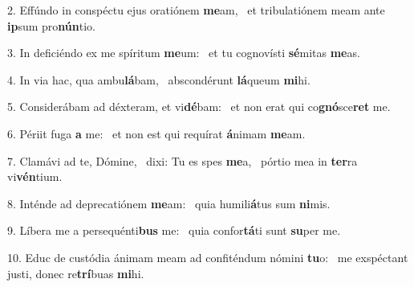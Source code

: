 2. Effúndo in conspéctu ejus oratiónem \textbf{me}am, \ast\  et tribulatiónem meam ante \textbf{ip}sum pro\textbf{nún}tio.\

3. In deficiéndo ex me spíritum \textbf{me}um: \ast\  et tu cognovísti \textbf{sé}mitas \textbf{me}as.\

4. In via hac, qua ambu\textbf{lá}bam, \ast\  abscondérunt \textbf{lá}queum \textbf{mi}hi.\

5. Considerábam ad déxteram, et vi\textbf{dé}bam: \ast\  et non erat qui co\textbf{gnó}sce\textbf{ret} me.\

6. Périit fuga \textbf{a} me: \ast\  et non est qui requírat \textbf{á}nimam \textbf{me}am.\

7. Clamávi ad te, Dómine, \dag\  dixi: Tu es spes \textbf{me}a, \ast\  pórtio mea in \textbf{ter}ra vi\textbf{vén}tium.\

8. Inténde ad deprecatiónem \textbf{me}am: \ast\  quia humili\textbf{á}tus sum \textbf{ni}mis.\

9. Líbera me a persequénti\textbf{bus} me: \ast\  quia confor\textbf{tá}ti sunt \textbf{su}per me.\

10. Educ de custódia ánimam meam ad confiténdum nómini \textbf{tu}o: \ast\  me exspéctant justi, donec re\textbf{trí}buas \textbf{mi}hi.\

